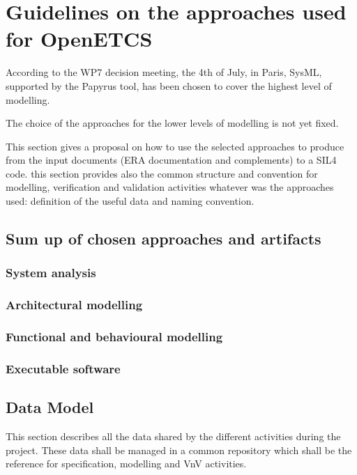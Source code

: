
\section{Guidelines on the approaches used for OpenETCS}


According to  the WP7 decision meeting, the 4th of July, in Paris, SysML, supported by the Papyrus tool,  has been chosen to  cover the highest level of modelling.

The choice of the approaches for the lower levels of modelling is not yet fixed.

This section gives a proposal on how to use the selected approaches to produce from the input documents (ERA documentation and complements)  to a SIL4 code. this section provides also the common structure and convention for modelling, verification and validation activities whatever was the approaches used: definition of the useful data and naming convention.

\subsection{Sum up of chosen approaches and artifacts}

\subsubsection{System analysis}

\subsubsection{Architectural modelling}

\subsubsection{Functional and behavioural modelling}

\subsubsection{Executable software}

\subsection{Data Model}

This section describes all the data shared by the different activities during the project.
These data shall be managed in a common repository which shall be the reference for specification, modelling and VnV activities.

